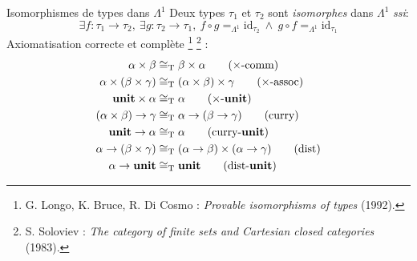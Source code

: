 \documentclass[serif]{beamer}
\newcommand{\ssi}{\textit{ssi}\xspace}
\newcommand{\unit}{\bold{unit}}
\newcommand{\T}{\mathrm{T}}
\begin{document}
\begin{frame}{Isomorphismes de types dans $\Lambda^1$}
\small
Deux types $\tau_1$ et $\tau_2$ sont \emph{isomorphes} dans $\Lambda^1$ \ssi :
\[ \exists f : \tau_1 \rightarrow \tau_2,\ \exists g : \tau_2 \rightarrow \tau_1,\ f \circ g =_{\Lambda^1} \mathrm{id}_{\tau_2} \ \wedge\ g \circ f =_{\Lambda^1} \mathrm{id}_{\tau_1} \]
Axiomatisation correcte et complète \footnote{G. Longo, K. Bruce, R. Di Cosmo : \textit{Provable isomorphisms of types} (1992).} \footnote{S. Soloviev : \textit{The category of finite sets and Cartesian closed categories} (1983).} :
\begin{align}
		\alpha \times \beta &\cong_\T
		\beta \times \alpha
		\label{prod_comm}
		\tag{$\times$-comm}
	\\
		\alpha \times (\beta \times \gamma) &\cong_\T
		(\alpha \times \beta) \times \gamma
		\label{prod_assoc}
		\tag{$\times$-assoc}
	\\
		\unit \times \alpha &\cong_\T
		\alpha
		\label{prod_unit}
		\tag{$\times$-$\unit$}
	\\
		(\alpha \times \beta) \rightarrow \gamma &\cong_\T
		\alpha \rightarrow (\beta \rightarrow \gamma)
		\label{curry}
		\tag{curry}
	\\
		\unit \rightarrow \alpha &\cong_\T
		\alpha
		\label{curry_unit}
		\tag{curry-$\unit$}
	\\
		\alpha \rightarrow (\beta \times \gamma) &\cong_\T
		(\alpha \rightarrow \beta) \times (\alpha \rightarrow \gamma)
		\label{dist}
		\tag{dist}
	\\
		\alpha \rightarrow \unit &\cong_\T
		\unit
		\label{dist_unit}
		\tag{dist-$\unit$}
\end{align}
\end{frame}

\end{document}
